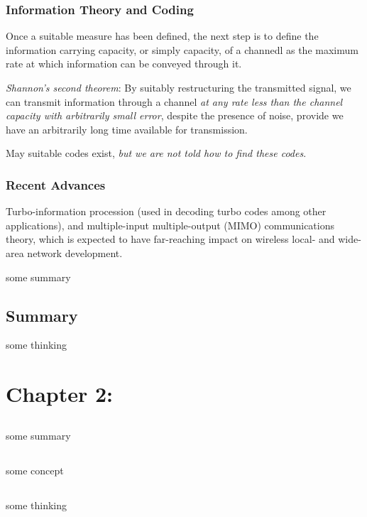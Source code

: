 \documentclass[12pt,a4paper]{book}
\begin{document}
\subsection{Information Theory and Coding}

Once a suitable measure has been defined, the next step is to define the information carrying capacity, or simply capacity, of a channedl as the maximum rate at which information can be conveyed through it.

\textit{Shannon's second theorem}: By suitably restructuring the transmitted signal, we can transmit information through a channel \textit{at any rate less than the channel capacity with arbitrarily small error}, despite the presence of noise, provide
we have an arbitrarily long time available for transmission.

May suitable codes exist, \textit{but we are not told how to find these codes}.

\subsection{Recent Advances}

Turbo-information procession (used in decoding turbo codes among other applications), and multiple-input multiple-output (MIMO) communications theory, which
is expected to have far-reaching impact on wireless local- and wide-area network development.
\begin{notebox}[Summary]
some summary
\end{notebox}

\section{Summary}
\begin{notebox}[Thinking]
some thinking
\end{notebox}

\chapter{Chapter 2:}
\section{}
\begin{notebox}[Summary]
some summary
\end{notebox}

\section{}
\begin{notebox}[Concept]
some concept 
\end{notebox}

\section{}
\begin{notebox}[Thinking]
some thinking
\end{notebox}
\end{document}
